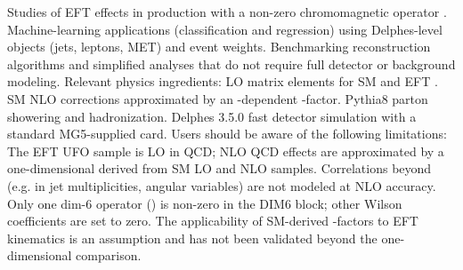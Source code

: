 {}\markdownRendererUlBeginTight
\markdownRendererUlItem Studies of EFT effects in  production with a non-zero chromomagnetic operator .\markdownRendererUlItemEnd 
\markdownRendererUlItem Machine-learning applications (classification and regression) using Delphes-level objects (jets, leptons, MET) and event weights.\markdownRendererUlItemEnd 
\markdownRendererUlItem Benchmarking reconstruction algorithms and simplified analyses that do not require full detector or background modeling.\markdownRendererUlItemEnd 
\markdownRendererUlEndTight \markdownRendererInterblockSeparator
{}Relevant physics ingredients:\markdownRendererInterblockSeparator
{}\markdownRendererUlBeginTight
\markdownRendererUlItem LO matrix elements for SM and EFT .\markdownRendererUlItemEnd 
\markdownRendererUlItem SM NLO corrections approximated by an -dependent -factor.\markdownRendererUlItemEnd 
\markdownRendererUlItem Pythia8 parton showering and hadronization.\markdownRendererUlItemEnd 
\markdownRendererUlItem Delphes 3.5.0 fast detector simulation with a standard MG5-supplied card.\markdownRendererUlItemEnd 
\markdownRendererUlEndTight \markdownRendererInterblockSeparator
{}
\markdownRendererSectionEnd \markdownRendererSectionBegin
{}\markdownRendererInterblockSeparator
{}Users should be aware of the following limitations:\markdownRendererInterblockSeparator
{}\markdownRendererUlBegin
\markdownRendererUlItem {}\markdownRendererInterblockSeparator
{}\markdownRendererUlBeginTight
\markdownRendererUlItem The EFT UFO sample is LO in QCD; NLO QCD effects are approximated by a one-dimensional  derived from SM LO and NLO samples.\markdownRendererUlItemEnd 
\markdownRendererUlItem Correlations beyond  (e.g. in jet multiplicities, angular variables) are not modeled at NLO accuracy.\markdownRendererUlItemEnd 
\markdownRendererUlEndTight \markdownRendererUlItemEnd 
\markdownRendererUlItem {}\markdownRendererInterblockSeparator
{}\markdownRendererUlBeginTight
\markdownRendererUlItem Only one dim-6 operator () is non-zero in the DIM6 block; other Wilson coefficients are set to zero.\markdownRendererUlItemEnd 
\markdownRendererUlItem The applicability of SM-derived -factors to EFT kinematics is an assumption and has not been validated beyond the one-dimensional  comparison.\markdownRendererUlItemEnd 
